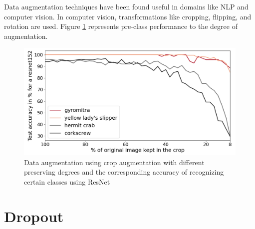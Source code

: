 Data augmentation techniques have been found useful in domains like NLP and computer vision. In computer vision, transformations like cropping, flipping, and rotation are used. Figure \ref{fig:DADeg} represents pre-class performance to the degree of augmentation.
\begin{figure}
    \begin{center}
        \includegraphics[width=\textwidth]{Figures/labelpreserveAug.png}
        \caption{\label{fig:DADeg}Data augmentation using crop augmentation with different preserving degrees and the corresponding accuracy of recognizing certain classes using ResNet \cite{balestriero2022effects}}
    \end{center}
\end{figure}


\section{Dropout}


